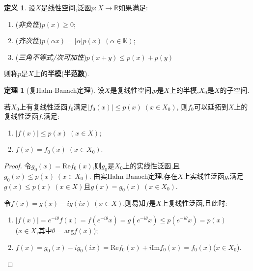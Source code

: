 \documentclass{ctexart}
\theoremstyle{definition}
\newtheorem{definition}{定义}
\newtheorem{theorem}{定理}
\theoremstyle{remark}
\begin{document}
	\begin{definition}
		设$X$是线性空间,泛函$p:X\to\mathbb{R}$如果满足:
		\begin{enumerate}
			\item (\textit{非负性})$p(x)\ge 0$;
			\item (\textit{齐次性})$p(\alpha x)=|\alpha|p(x)\;(\alpha\in\mathbb{K})$;
			\item (\textit{三角不等式/次可加性})$p(x+y)\le p(x)+p(y)$
		\end{enumerate}
		则称$p$是$X$上的\textbf{半模}(\textbf{半范数}).
	\end{definition}
	\begin{theorem}[复Hahn-Banach定理]
		设$X$是复线性空间,$p$是$X$上的半模,$X_0$是$X$的子空间.
		
		若$X_0$上有复线性泛函$f_0$满足$|f_0(x)|\le p(x)\;(x\in X_0)$,
		则$f_0$可以延拓到$X$上的复线性泛函$f$,满足:
		\begin{enumerate}
			\item $|f(x)|\le p(x)\;(x\in X)$;
			\item $f(x)=f_0(x)\;(x\in X_0)$.
		\end{enumerate}
	\end{theorem}
	\begin{proof}
		令$g_0(x)=\mathrm{Re}f_0(x)$,则$g_0$是$X_0$上的实线性泛函,且$g_0(x)\le p(x)\;(x\in X_0)$.
		由实Hahn-Banach定理,存在$X$上实线性泛函$g$,满足$g(x)\le p(x)\;(x\in X)$且$g(x)=g_0(x)\;(x\in X_0)$.
		
		令$f(x)=g(x)-ig(ix)\;(x\in X)$,则易知$f$是$X$上复线性泛函,且此时:
		\begin{enumerate}
			\item $|f(x)|=e^{-i\theta}f(x)=f(e^{-i\theta}x)=g(e^{-i\theta}x)\le p(e^{-i\theta}x)=p(x)$\\($x\in X$,其中$\theta=\mathrm{arg}f(x)$);
			\item $f(x)=g_0(x)-ig_0(ix)=\mathrm{Re}f_0(x)+i\mathrm{Im}f_0(x)=f_0(x)$\;($x\in X_0$).
		\end{enumerate}
	\end{proof}
	
\end{document}
